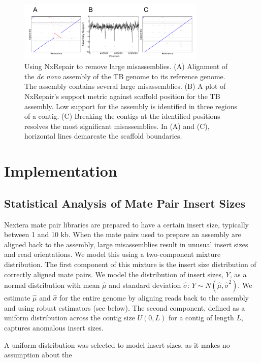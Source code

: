 \documentclass[fleqn,10pt]{wlpeerj}
\begin{document}
\begin{figure}
\centerline{\includegraphics[width=0.8\textwidth]{fig1_nxrepair.pdf}}
\caption{Using NxRepair to remove large misassemblies. (A) Alignment of the \textit{de novo} assembly of the TB genome to its reference genome. The assembly contains several large misassemblies. (B) A plot of NxRepair's support metric against scaffold position for the TB assembly. Low support for the assembly is identified in three regions of a contig. (C) Breaking the contigs at the identified positions resolves the most significant misassemblies. In (A) and (C), horizontal lines demarcate the scaffold boundaries.}\label{fig:NxRepair}
\end{figure}

\section*{Implementation}
\subsection*{Statistical Analysis of Mate Pair Insert Sizes}
Nextera mate pair libraries are prepared to have a certain insert size, typically between 1 and 10 kb. When the mate pairs used to prepare an assembly are aligned back to the assembly, large misassemblies result in unusual insert sizes and read orientations. We model this using a two-component mixture distribution. The first component of this mixture is the insert size distribution of correctly aligned mate pairs.  We model the distribution of insert sizes, $Y$, as a normal distribution with mean $\hat{\mu}$ and standard deviation $\hat{\sigma}$: $Y \sim N(\hat{\mu},\hat{\sigma}^2).$ We estimate $\hat{\mu}$ and $\hat{\sigma}$ for the entire genome by aligning reads back to the assembly and using robust estimators (see below). The second component, defined as a uniform distribution across the contig size $U(0,L)$ for a contig of length $L$, captures anomalous insert sizes. 

A uniform distribution was selected to model insert sizes, as it makes no assumption about the 
\end{document}
